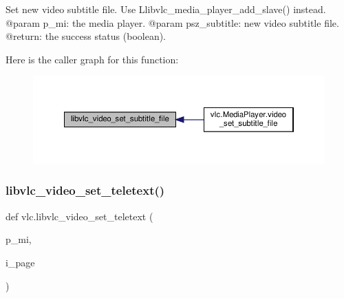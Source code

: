 \begin{DoxyVerb}Set new video subtitle file.
\deprecated Use L{libvlc_media_player_add_slave}() instead.
@param p_mi: the media player.
@param psz_subtitle: new video subtitle file.
@return: the success status (boolean).
\end{DoxyVerb}
 Here is the caller graph for this function\+:
\nopagebreak
\begin{figure}[H]
\begin{center}
\leavevmode
\includegraphics[width=350pt]{namespacevlc_a51adbf5641c80acf9c96eb0a6395157b_icgraph}
\end{center}
\end{figure}
\mbox{\label{namespacevlc_af977323ec20485a5a0ea9b824eca479f}} 
\subsubsection{\texorpdfstring{libvlc\+\_\+video\+\_\+set\+\_\+teletext()}{libvlc\_video\_set\_teletext()}}
{\footnotesize\ttfamily def vlc.\+libvlc\+\_\+video\+\_\+set\+\_\+teletext (\begin{DoxyParamCaption}\item[{}]{p\+\_\+mi,  }\item[{}]{i\+\_\+page }\end{DoxyParamCaption})}

